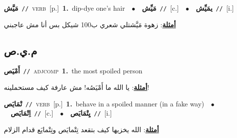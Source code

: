 \documentclass[10pt,a4paper,twoside]{article} %
\begin{document}
\begin{multicols}{2}
{\setlength\topsep{0pt}\textbf{\foreignlanguage{arabic}{مَيَّش}}\ {\color{gray}\texttt{//}\color{black}}\ \textsc{verb}\ [p.]\ \textbf{1.}~dip-dye one's hair\ \ $\bullet$\ \ \setlength\topsep{0pt}\textbf{\foreignlanguage{arabic}{مَيِّش}}\ {\color{gray}\texttt{//}\color{black}}\ [c.]\ \ $\bullet$\ \ \setlength\topsep{0pt}\textbf{\foreignlanguage{arabic}{يمَيِّش}}\ {\color{gray}\texttt{//}\color{black}}\ [i.]\  \begin{flushright}\color{gray}\foreignlanguage{arabic}{\textbf{\underline{\foreignlanguage{arabic}{أمثلة}}}: زهوة مَيَّشتلي شعري ب100 شيكل بس أنا مش عاجبني}\end{flushright}\color{black}} \vspace{2mm}

\vspace{-3mm}
\subsection*{\color{blue}\foreignlanguage{arabic}{م.ي.ص}\color{blue}{}} 

{\setlength\topsep{0pt}\textbf{\foreignlanguage{arabic}{أَمْيَص}}\ {\color{gray}\texttt{//}\color{black}}\ \textsc{adj\textunderscore comp}\ \textbf{1.}~the most spoiled person\  \begin{flushright}\color{gray}\foreignlanguage{arabic}{\textbf{\underline{\foreignlanguage{arabic}{أمثلة}}}: يا الله ما أَمْيَصُه! مش عارفة كيف مستحملينه!}\end{flushright}\color{black}} \vspace{2mm}

{\setlength\topsep{0pt}\textbf{\foreignlanguage{arabic}{تْمَايَص}}\ {\color{gray}\texttt{//}\color{black}}\ \textsc{verb}\ [p.]\ \textbf{1.}~behave in a spoiled manner (in a fake way)\ \ $\bullet$\ \ \setlength\topsep{0pt}\textbf{\foreignlanguage{arabic}{اِتْمَايَص}}\ {\color{gray}\texttt{//}\color{black}}\ [c.]\ \ $\bullet$\ \ \setlength\topsep{0pt}\textbf{\foreignlanguage{arabic}{يِتْمَايَص}}\ {\color{gray}\texttt{//}\color{black}}\ [i.]\  \begin{flushright}\color{gray}\foreignlanguage{arabic}{\textbf{\underline{\foreignlanguage{arabic}{أمثلة}}}: الله يخزيها كيف بتقعد تِتْمايَص وتِتْمايَع قدام الزلام}\end{flushright}\color{black}} \vspace{2mm}


\end{multicols}
\end{document}
